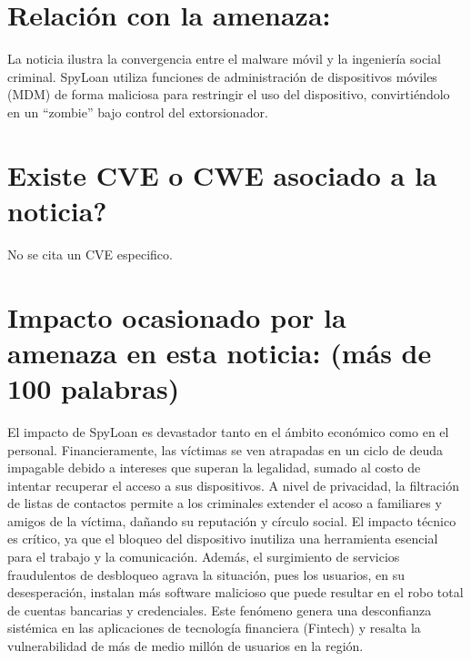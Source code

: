     \section{Relación con la amenaza:}
    La noticia ilustra la convergencia entre el malware 
    móvil y la ingeniería social criminal. 
    SpyLoan utiliza funciones de administración 
    de dispositivos móviles (MDM) de forma maliciosa 
    para restringir el uso del dispositivo, convirtiéndolo 
    en un ``zombie'' bajo control del extorsionador.

    \section{\textquestiondown Existe CVE o CWE asociado a la noticia?}
    No se cita un CVE especifico.

    
    \section{Impacto ocasionado por la amenaza en esta noticia: (más de 100 palabras)}
    El impacto de SpyLoan es devastador tanto en el ámbito económico como en el personal. Financieramente, las víctimas se ven atrapadas en un ciclo de deuda impagable debido a intereses que superan la legalidad, sumado al costo de intentar recuperar el acceso a sus dispositivos. A nivel de privacidad, la filtración de listas de contactos permite a los criminales extender el acoso a familiares y amigos de la víctima, dañando su reputación y círculo social. El impacto técnico es crítico, ya que el bloqueo del dispositivo inutiliza una herramienta esencial para el trabajo y la comunicación. Además, el surgimiento de servicios fraudulentos de desbloqueo agrava la situación, pues los usuarios, en su desesperación, instalan más software malicioso que puede resultar en el robo total de cuentas bancarias y credenciales. Este fenómeno genera una desconfianza sistémica en las aplicaciones de tecnología financiera (Fintech) y resalta la vulnerabilidad de más de medio millón de usuarios en la región.